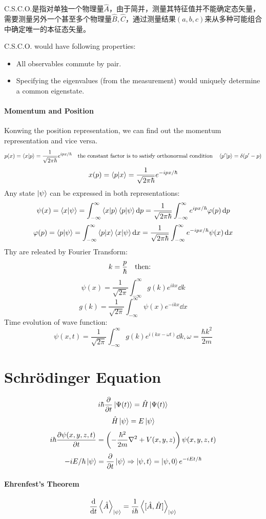 \documentclass[a4paper,10pt]{article}
\begin{document}
C.S.C.O.是指对单独一个物理量$\hat{A}$，由于简并，测量其特征值并不能确定态矢量，需要测量另外一个甚至多个物理量$\hat{B},\hat{C}$，通过测量结果$(a,b,c)$来从多种可能组合中确定唯一的本征态矢量。

C.S.C.O. would have following properties:
\begin{itemize}
    \item All observables commute by pair.
    \item Specifying the eigenvalues (from the measurement) would uniquely determine a common eigenstate.
\end{itemize}
\paragraph{Momentum and Position}
Konwing the position representation, we can find out the momentum representation and vice versa.
$$p(x)=\bra{x}\ket{p}=\frac{1}{\sqrt{2\pi\hbar}}e^{ipx/\hbar}\qq{the constant factor is to satisfy orthonormal condition}\bra{p^\prime}\ket{p}=\delta(p^\prime-p)$$
$$x(p)=\bra{p}\ket{x}=\frac{1}{\sqrt{2\pi\hbar}}e^{-ipx/\hbar}$$
Any state $\ket{\psi}$ can be expressed in both representations:
$$\psi(x)=\bra{x}\ket{\psi}=\int_{-\infty}^{\infty}\bra{x}\ket{p}\bra{p}\ket{\psi}\dd{p}=\frac{1}{\sqrt{2\pi\hbar}}\int_{-\infty}^{\infty}e^{ipx/\hbar}\varphi(p)\dd{p}$$
$$\varphi(p)=\bra{p}\ket{\psi}=\int_{-\infty}^{\infty}\bra{p}\ket{x}\bra{x}\ket{\psi}\dd{x}=\frac{1}{\sqrt{2\pi\hbar}}\int_{-\infty}^{\infty}e^{-ipx/\hbar}\psi(x)\dd{x}$$
Thy are releated by Fourier Transform:
$$k=\frac{p}{\hbar}\qq{then:}$$
$$\psi(x)=\frac{1}{\sqrt{2\pi}}\int_{-\infty}^{\infty}g(k)e^{ikx}\dd{k}$$
$$g(k)=\frac{1}{\sqrt{2\pi}}\int_{-\infty}^{\infty}\psi(x)e^{-ikx}\dd{x}$$
Time evolution of wave function:
$$\psi(x,t)=\frac{1}{\sqrt{2\pi}}\int_{-\infty}^{\infty}g(k)e^{i(kx-\omega t)}\dd{k},\omega=\frac{\hbar k^2}{2m}$$
\section{Schrödinger Equation}
$$i\hbar\pdv{t}\ket{\Psi(t)}=\hat{H}\ket{\Psi(t)}$$
$$\hat{H}\ket{\psi}=E\ket{\psi}$$
$$i\hbar\pdv{\psi(x,y,z,t)}{t}=\left(-\frac{\hbar^2}{2m}\laplacian+V(x,y,z)\right)\psi(x,y,z,t)$$
$$-iE/\hbar\ket{\psi}=\pdv{t}\ket{\psi}\Rightarrow\ket{\psi,t}=\ket{\psi,0}e^{-iEt/\hbar}$$
\paragraph{Ehrenfest's Theorem}
$$\dv{t}\expval{\hat{A}}_{\ket{\psi}}=\frac{1}{i\hbar}\expval{[\hat{A},\hat{H}]}_{\ket{\psi}}$$
\end{document}
